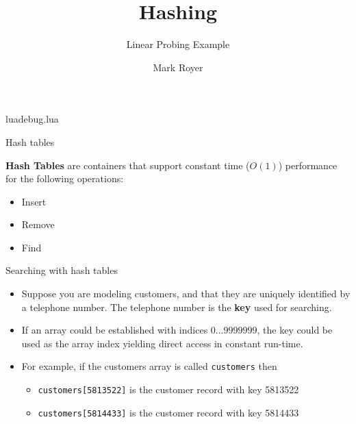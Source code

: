 \documentclass{beamer}
\title{Hashing}
\subtitle{Linear Probing Example}
\date{}
\author{Mark Royer}
\begin{document}

\newwrite\luadebug
\immediate\openout\luadebug luadebug.lua
\AtEndDocument{\immediate\closeout\luadebug}
\newcommand\directluadebug{\immediate\write\luadebug}



\begin{frame}
  \titlepage
\end{frame}


\begin{frame}[fragile]{Hash tables}

\textbf{Hash Tables} are containers that support constant time ($O(1)$)
performance for the following operations:

\begin{itemize}

  \item Insert
  \item Remove
  \item Find

\end{itemize}

\end{frame}


\begin{frame}[fragile]{Searching with hash tables}

\begin{itemize}
\item Suppose you are modeling customers, and that they are uniquely
  identified by a telephone number.  The telephone number is the
  \textbf{key} used for searching.

\item If an array could be established with indices $0 \dots 9999999$,
  the key could be used as the array index yielding direct access in
  constant run-time.  

\item For example, if the customers array is called
  \lstinline$customers$ then

  \begin{itemize}

  \item \lstinline$customers[5813522]$ is the customer record with key 5813522
    
  \item  \lstinline$customers[5814433]$ is the customer record with key 5814433
    
  \end{itemize}
  
\end{itemize}

\end{frame}
\end{document}
